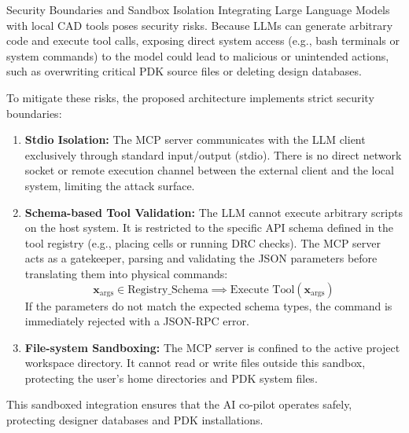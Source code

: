 \begin{thesiscallout}{Security Boundaries and Sandbox Isolation}
Integrating Large Language Models with local CAD tools poses security risks. Because LLMs can generate arbitrary code and execute tool calls, exposing direct system access (e.g., bash terminals or system commands) to the model could lead to malicious or unintended actions, such as overwriting critical PDK source files or deleting design databases.

To mitigate these risks, the proposed architecture implements strict security boundaries:
\begin{enumerate}
    \item \textbf{Stdio Isolation:} The MCP server communicates with the LLM client exclusively through standard input/output (stdio). There is no direct network socket or remote execution channel between the external client and the local system, limiting the attack surface.
    \item \textbf{Schema-based Tool Validation:} The LLM cannot execute arbitrary scripts on the host system. It is restricted to the specific API schema defined in the tool registry (e.g., placing cells or running DRC checks). The MCP server acts as a gatekeeper, parsing and validating the JSON parameters before translating them into physical commands:
    \begin{equation}
        \mathbf{x}_{\text{args}} \in \text{Registry\_Schema} \implies \text{Execute Tool}(\mathbf{x}_{\text{args}})
    \end{equation}
    If the parameters do not match the expected schema types, the command is immediately rejected with a JSON-RPC error.
    \item \textbf{File-system Sandboxing:} The MCP server is confined to the active project workspace directory. It cannot read or write files outside this sandbox, protecting the user's home directories and PDK system files.
\end{enumerate}
This sandboxed integration ensures that the AI co-pilot operates safely, protecting designer databases and PDK installations.
\end{thesiscallout}

